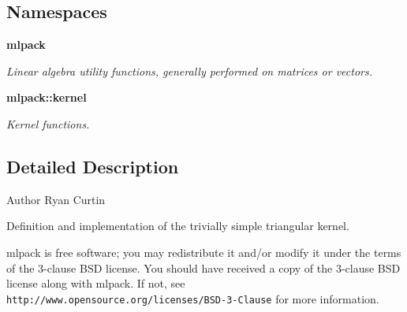 \subsection*{Namespaces}
\begin{DoxyCompactItemize}
\item 
 {\bf mlpack}
\begin{DoxyCompactList}\small\item\em Linear algebra utility functions, generally performed on matrices or vectors. \end{DoxyCompactList}\item 
 {\bf mlpack\+::kernel}
\begin{DoxyCompactList}\small\item\em Kernel functions. \end{DoxyCompactList}\end{DoxyCompactItemize}


\subsection{Detailed Description}
\begin{DoxyAuthor}{Author}
Ryan Curtin
\end{DoxyAuthor}
Definition and implementation of the trivially simple triangular kernel.

mlpack is free software; you may redistribute it and/or modify it under the terms of the 3-\/clause B\+SD license. You should have received a copy of the 3-\/clause B\+SD license along with mlpack. If not, see {\tt http\+://www.\+opensource.\+org/licenses/\+B\+S\+D-\/3-\/\+Clause} for more information. 